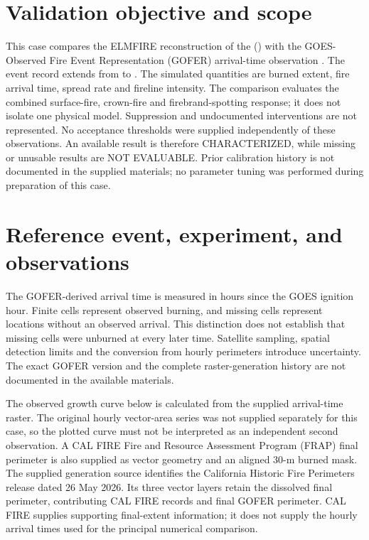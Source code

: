 \section{Validation objective and scope}

This case compares the ELMFIRE reconstruction of the \FireName{} (\FireYear{})
with the GOES-Observed Fire Event Representation (GOFER) arrival-time observation
\cite{liu2024gofer,goferdata}. The event record extends from \EventStart{} to
\EventEnd{}. The simulated quantities are burned extent, fire arrival time,
spread rate and fireline intensity. The comparison evaluates the combined
surface-fire, crown-fire and firebrand-spotting response; it does not isolate
one physical model. Suppression and undocumented interventions are not represented.
No acceptance thresholds were supplied independently of these observations.
An available result is therefore CHARACTERIZED, while missing or unusable results
are NOT EVALUABLE. Prior calibration history is not documented in the supplied
materials; no parameter tuning was performed during preparation of this case.

\section{Reference event, experiment, and observations}

\FireSummary{} The GOFER-derived arrival time is measured in hours since the
GOES ignition hour. Finite cells represent observed burning, and missing cells
represent locations without an observed arrival. This distinction does not
establish that missing cells were unburned at every later time. Satellite
sampling, spatial detection limits and the conversion from hourly perimeters
introduce uncertainty. The exact GOFER version and the complete raster-generation
history are not documented in the available materials.

The observed growth curve below is calculated from the supplied arrival-time
raster. The original hourly vector-area series was not supplied separately for
this case, so the plotted curve must not be interpreted as an independent
second observation. A CAL FIRE Fire and Resource Assessment Program (FRAP)
final perimeter is also supplied as vector geometry and an aligned 30-m burned
mask. The supplied generation source identifies the California Historic Fire
Perimeters release dated 26 May 2026. Its three vector layers retain the
dissolved final perimeter, contributing CAL FIRE records and final GOFER
perimeter. CAL FIRE supplies supporting final-extent information; it does not
supply the hourly arrival times used for the principal numerical comparison.

